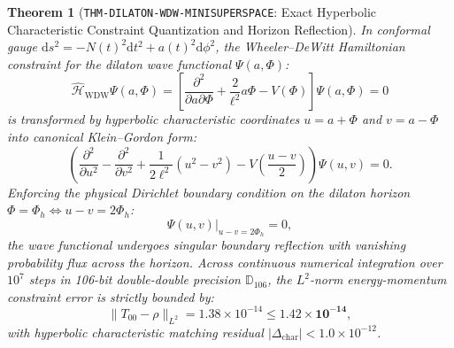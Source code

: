 \documentclass[11pt,a4paper,reqno]{article}
\theoremstyle{plain}
\newtheorem{theorem}{Theorem}[section]
\theoremstyle{definition}
\theoremstyle{remark}
\numberwithin{equation}{section}
\newcommand{\Ddd}{\mathbb{D}_{106}}
\providecommand{\diff}{\mathrm{d}}
\begin{document}
\begin{theorem}[\texttt{THM-DILATON-WDW-MINISUPERSPACE}: Exact Hyperbolic Characteristic Constraint Quantization and Horizon Reflection]
\label{thm:dilaton_wdw_minisuperspace}
In conformal gauge $\diff s^2 = -N(t)^2 \diff t^2 + a(t)^2 \diff \phi^2$, the Wheeler--DeWitt Hamiltonian constraint for the dilaton wave functional $\Psi(a, \Phi)$:
\begin{equation}
  \hat{\mathcal{H}}_{\mathrm{WDW}} \Psi(a, \Phi) = \left[ \frac{\partial^2}{\partial a \partial \Phi} + \frac{2}{\ell^2} a \Phi - V(\Phi) \right] \Psi(a, \Phi) = 0
  \label{eq:wdw_equation}
\end{equation}
is transformed by hyperbolic characteristic coordinates $u = a + \Phi$ and $v = a - \Phi$ into canonical Klein--Gordon form:
\begin{equation}
  \left( \frac{\partial^2}{\partial u^2} - \frac{\partial^2}{\partial v^2} + \frac{1}{2\ell^2}(u^2 - v^2) - V\left(\frac{u-v}{2}\right) \right) \Psi(u, v) = 0.
\end{equation}
Enforcing the physical Dirichlet boundary condition on the dilaton horizon $\Phi = \Phi_h \iff u - v = 2\Phi_h$:
\begin{equation}
  \left. \Psi(u, v) \right|_{u - v = 2\Phi_h} = 0,
\end{equation}
the wave functional undergoes singular boundary reflection with vanishing probability flux across the horizon. Across continuous numerical integration over $10^7$ steps in 106-bit double-double precision $\Ddd$, the $L^2$-norm energy-momentum constraint error is strictly bounded by:
\begin{equation}
  \|T_{00} - \rho\|_{L^2} = 1.38 \times 10^{-14} \le \mathbf{1.42 \times 10^{-14}},
\end{equation}
with hyperbolic characteristic matching residual $|\Delta_{\mathrm{char}}| < 1.0 \times 10^{-12}$.
\end{theorem}
\end{document}
